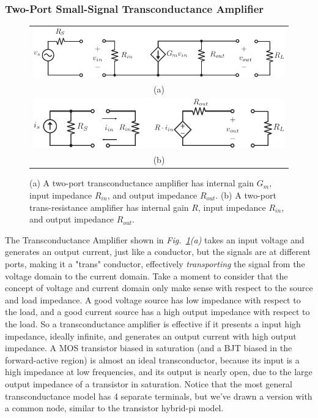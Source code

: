 \subsubsection{Two-Port Small-Signal Transconductance Amplifier}
\begin{figure}[tb]
\centering
\begin{tabular}{c}
\includegraphics[width=.7\columnwidth]{gmamp}\\
(a)\\
\includegraphics[width=.7\columnwidth]{ramp}\\
(b)\\
\end{tabular}
\caption{(a) A two-port transconductance amplifier has internal gain $G_m$, input impedance $R_{in}$, and output impedance $R_{out}$.  (b) A two-port trans-resistance amplifier has internal gain $R$, input impedance $R_{in}$, and output impedance $R_{out}$.}
\label{fig:gm_z_amp}
\end{figure}

The Transconductance Amplifier shown in \emph{Fig.~\ref{fig:gm_z_amp}(a)} takes an input voltage and generates an output current, just like a conductor, but the signals are at different ports, making it a "trans" conductor, effectively \emph{transporting} the signal from the voltage domain to the current domain.  Take a moment to consider that the concept of voltage and current domain only make sense with respect to the source and load impedance.  A good voltage source has low impedance with respect to the load, and a good current source has a high output impedance with respect to the load.  So a transconductance amplifier is effective if it presents a input high impedance, ideally infinite, and generates an output current with high output impedance.  A MOS transistor biased in saturation (and a BJT biased in the forward-active region) is almost an ideal transconductor, because its input is a high impedance at low frequencies, and its output is nearly open, due to the large output impedance of a transistor in saturation.  
Notice that the most general transconductance model has 4 separate terminals, but we've drawn a version with a common node, similar to the transistor hybrid-pi model. 
